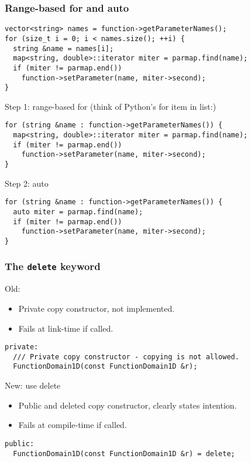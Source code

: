 \documentclass[english]{beamer}
\begin{document}
\begin{frame}[fragile]
    \frametitle{Range-based for and auto}
\begin{lstlisting}
vector<string> names = function->getParameterNames();
for (size_t i = 0; i < names.size(); ++i) {
  string &name = names[i];
  map<string, double>::iterator miter = parmap.find(name);
  if (miter != parmap.end())
    function->setParameter(name, miter->second);
}
\end{lstlisting}
\pause
Step 1: \alert{range-based for} (think of Python's \alert{for item in list:})
\begin{lstlisting}
for (string &name : function->getParameterNames()) {
  map<string, double>::iterator miter = parmap.find(name);
  if (miter != parmap.end())
    function->setParameter(name, miter->second);
}
\end{lstlisting}
\pause
Step 2: \alert{auto}
\begin{lstlisting}
for (string &name : function->getParameterNames()) {
  auto miter = parmap.find(name);
  if (miter != parmap.end())
    function->setParameter(name, miter->second);
}
\end{lstlisting}
\end{frame}



\begin{frame}[fragile]
    \frametitle{The \texttt{delete} keyword}
Old:
\begin{itemize}
    \item Private copy constructor, not implemented.
    \item Fails at link-time if called.
\end{itemize}
\begin{lstlisting}
private:
  /// Private copy constructor - copying is not allowed.
  FunctionDomain1D(const FunctionDomain1D &r);
\end{lstlisting}
New: use \alert{delete}
\begin{itemize}
    \item Public and deleted copy constructor, clearly states intention.
    \item Fails at compile-time if called.
\end{itemize}
\begin{lstlisting}
public:
  FunctionDomain1D(const FunctionDomain1D &r) = delete;
\end{lstlisting}
\end{frame}
\end{document}
